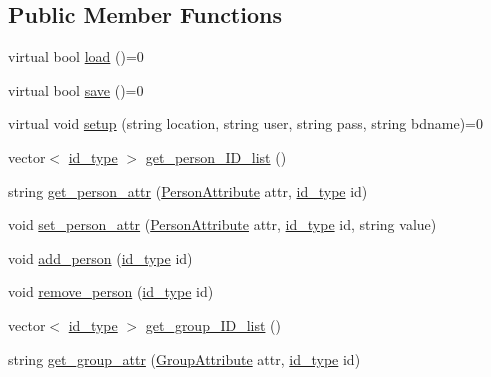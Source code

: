 \subsection*{Public Member Functions}
\begin{DoxyCompactItemize}
\item 
virtual bool \hyperlink{classstorage_1_1DataStorage_a1cfb8136faea457c36a1adf1d024b2e1}{load} ()=0
\item 
virtual bool \hyperlink{classstorage_1_1DataStorage_a973b7fd5741ad0159d95a67b91734dd2}{save} ()=0
\item 
virtual void \hyperlink{classstorage_1_1DataStorage_aabde44460aae44655dbdf69b8128ad22}{setup} (string location, string user, string pass, string bdname)=0
\item 
vector$<$ \hyperlink{types_8h_a0b60c08a3ab1435cccc5643d32d8ccee}{id\_\-type} $>$ \hyperlink{classstorage_1_1DataStorage_a06a2348464bcab2acc728716679556fe}{get\_\-person\_\-ID\_\-list} ()
\item 
string \hyperlink{classstorage_1_1DataStorage_aa4ffb98c676775ad88253ebeaa790a4b}{get\_\-person\_\-attr} (\hyperlink{namespacestorage_a42f9d3eac07801f5551c7e5b60d6e9ce}{PersonAttribute} attr, \hyperlink{types_8h_a0b60c08a3ab1435cccc5643d32d8ccee}{id\_\-type} id)
\item 
void \hyperlink{classstorage_1_1DataStorage_a4bfa24dc03cfb2e93ef3cd59fa0c58ce}{set\_\-person\_\-attr} (\hyperlink{namespacestorage_a42f9d3eac07801f5551c7e5b60d6e9ce}{PersonAttribute} attr, \hyperlink{types_8h_a0b60c08a3ab1435cccc5643d32d8ccee}{id\_\-type} id, string value)
\item 
void \hyperlink{classstorage_1_1DataStorage_ab2987fe459ddc88e82b48cd1b38fe68c}{add\_\-person} (\hyperlink{types_8h_a0b60c08a3ab1435cccc5643d32d8ccee}{id\_\-type} id)
\item 
void \hyperlink{classstorage_1_1DataStorage_a030dfcb2b1cadaf99eb3bcbc784dae9b}{remove\_\-person} (\hyperlink{types_8h_a0b60c08a3ab1435cccc5643d32d8ccee}{id\_\-type} id)
\item 
vector$<$ \hyperlink{types_8h_a0b60c08a3ab1435cccc5643d32d8ccee}{id\_\-type} $>$ \hyperlink{classstorage_1_1DataStorage_a82642d970b251d7561c4e579f500eed1}{get\_\-group\_\-ID\_\-list} ()
\item 
string \hyperlink{classstorage_1_1DataStorage_a316cbd7ab0c9b1bb67af1a82a9428fa7}{get\_\-group\_\-attr} (\hyperlink{namespacestorage_abe112dd5cc72469c2ce28e3a5ea229a3}{GroupAttribute} attr, \hyperlink{types_8h_a0b60c08a3ab1435cccc5643d32d8ccee}{id\_\-type} id)
\item 

\end{DoxyCompactItemize}
